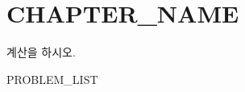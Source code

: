 \chapter{CHAPTER_NAME}
계산을 하시오.
\begin{multicols}{2}
    \begin{enumerate}[label=\scriptsize{(\arabic*)}]
        PROBLEM_LIST
    \end{enumerate}    
\end{multicols}